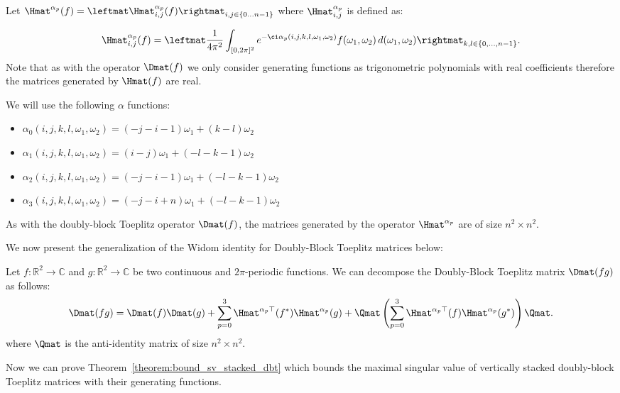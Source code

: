 Let $\Hmat^{\alpha_p} (f) = \leftmat \Hmat^{\alpha_p}_{i,j}(f) \rightmat_{i,j \in \{0 \ldots n-1 \}}$ where $\Hmat^{\alpha_p}_{i,j}$ is defined as:

\begin{equation}
  \Hmat^{\alpha_p}_{i,j}(f) =\leftmat \frac{1}{4\pi^{2}}\int_{[0,2\pi]^{2}} e^{-\ci \alpha_p(i, j, k, l, \omega_1, \omega_2)}  f(\omega_{1},\omega_{2})\,d(\omega_{1},\omega_{2})
  \rightmat_{k,l \in \{0, \ldots, n-1 \}} .
\end{equation}
Note that as with the operator $\Dmat(f)$ we only consider generating functions as trigonometric polynomials with real coefficients therefore the matrices generated by $\Hmat(f)$ are real. 

We will use the following $\alpha$ functions:
\begin{itemize}
    \item[] $\alpha_0(i, j, k, l, \omega_1, \omega_2) = (-j-i-1)\omega_1 + (k-l)\omega_2$
    \item[] $\alpha_1(i, j, k, l, \omega_1, \omega_2) = (i-j)\omega_1 + (-l-k-1)\omega_2$
    \item[] $\alpha_2(i, j, k, l, \omega_1, \omega_2) = (-j-i-1)\omega_1 + (-l-k-1)\omega_2$
    \item[] $\alpha_3(i, j, k, l, \omega_1, \omega_2) = (-j-i+n)\omega_1 + (-l-k-1)\omega_2$
\end{itemize}
As with the doubly-block Toeplitz operator $\Dmat(f)$, the matrices generated by the operator $\Hmat^{\alpha_p}$ are of size $n^2 \times n^2$. 

We now present the generalization of the Widom identity for Doubly-Block Toeplitz matrices below:
\begin{lemma} \label{theorem:widom_idenity}
Let $f:\mathbb{R}^2 \rightarrow \mathbb{C}$ and $g:\mathbb{R}^2 \rightarrow \mathbb{C}$ be two continuous and $2\pi$-periodic functions. 
We can decompose the Doubly-Block Toeplitz matrix $\Dmat(fg)$ as follows:
\begin{equation}
    \Dmat(fg) = \Dmat(f)\Dmat(g) + \sum_{p=0}^3 \Hmat^{\alpha_p \top}(f^*) \Hmat^{\alpha_p}(g) + \Qmat \left( \sum_{p=0}^3 \Hmat^{\alpha_p \top}(f) \Hmat^{\alpha_p }(g^*) \right) \Qmat.
\end{equation}
where $\Qmat$ is the anti-identity matrix of size $n^2 \times n^2$.
\end{lemma}


Now we can prove Theorem~\ref{theorem:bound_sv_stacked_dbt} which bounds the maximal singular value of vertically stacked doubly-block Toeplitz matrices with their generating functions. 


